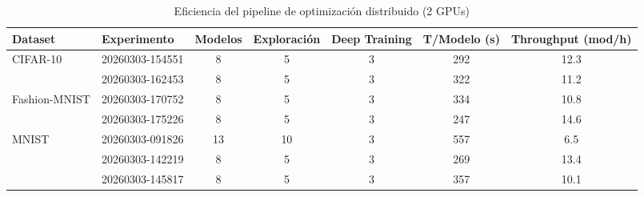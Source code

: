 \begin{table}[htbp]
\centering
\caption{Eficiencia del pipeline de optimización distribuido (2 GPUs)}
\label{tab:eficiencia_pipeline}
\small
\begin{tabular}{llccccc}
\toprule
\textbf{Dataset} & \textbf{Experimento} & \textbf{Modelos} & \textbf{Exploración} & \textbf{Deep Training} & \textbf{T/Modelo (s)} & \textbf{Throughput (mod/h)} \\
\midrule
  CIFAR-10 & 20260303-154551 & 8 & 5 & 3 & 292 & 12.3 \\
   & 20260303-162453 & 8 & 5 & 3 & 322 & 11.2 \\
\midrule
  Fashion-MNIST & 20260303-170752 & 8 & 5 & 3 & 334 & 10.8 \\
   & 20260303-175226 & 8 & 5 & 3 & 247 & 14.6 \\
\midrule
  MNIST & 20260303-091826 & 13 & 10 & 3 & 557 & 6.5 \\
   & 20260303-142219 & 8 & 5 & 3 & 269 & 13.4 \\
   & 20260303-145817 & 8 & 5 & 3 & 357 & 10.1 \\
\bottomrule
\end{tabular}
\end{table}